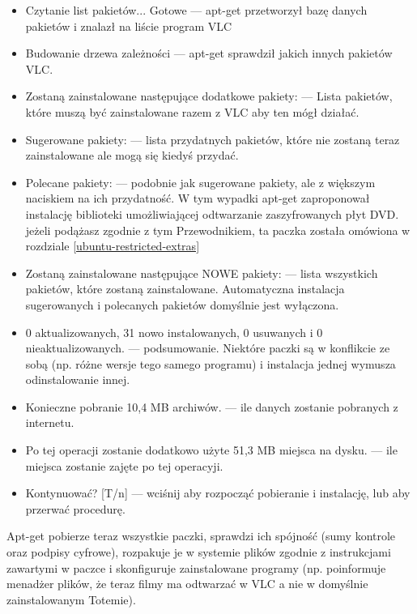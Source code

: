 \begin{itemize}
\item \textcolor{ubuntu_orange}{Czytanie list pakietów... Gotowe} --- apt-get przetworzył bazę danych pakietów i znalazł na liście program VLC
\item \textcolor{ubuntu_orange}{Budowanie drzewa zależności} --- apt-get sprawdził jakich innych pakietów VLC.
\item \textcolor{ubuntu_orange}{Zostaną zainstalowane następujące dodatkowe pakiety:} --- Lista pakietów, które muszą być zainstalowane razem z VLC aby ten mógł działać.
\item \textcolor{ubuntu_orange}{Sugerowane pakiety:} --- lista przydatnych pakietów, które nie zostaną teraz zainstalowane ale mogą się kiedyś przydać.
\item \textcolor{ubuntu_orange}{Polecane pakiety:} --- podobnie jak sugerowane pakiety, ale z większym naciskiem na ich przydatność. W tym wypadki apt-get zaproponował instalację biblioteki umożliwiającej odtwarzanie zaszyfrowanych płyt DVD. jeżeli podążasz zgodnie z tym Przewodnikiem, ta paczka została omówiona w rozdziale \ref{ubuntu-restricted-extras}
\item \textcolor{ubuntu_orange}{Zostaną zainstalowane następujące NOWE pakiety:} --- lista wszystkich pakietów, które zostaną zainstalowane. Automatyczna instalacja sugerowanych i polecanych pakietów domyślnie jest wyłączona.
\item \textcolor{ubuntu_orange}{0 aktualizowanych, 31 nowo instalowanych, 0 usuwanych i 0 nieaktualizowanych.} --- podsumowanie. Niektóre paczki są w konflikcie ze sobą (np. różne wersje tego samego programu) i instalacja jednej wymusza odinstalowanie innej.
\item \textcolor{ubuntu_orange}{Konieczne pobranie 10,4 MB archiwów.} --- ile danych zostanie pobranych z internetu.
\item \textcolor{ubuntu_orange}{Po tej operacji zostanie dodatkowo użyte 51,3 MB miejsca na dysku.} --- ile miejsca zostanie zajęte po tej operacyji.
\item \textcolor{ubuntu_orange}{Kontynuować? [T/n]} --- wciśnij  aby rozpocząć pobieranie i instalację, lub  aby przerwać procedurę.
\end{itemize}

Apt-get pobierze teraz wszystkie paczki, sprawdzi ich spójność (sumy kontrole oraz podpisy cyfrowe), rozpakuje je w systemie plików zgodnie z instrukcjami zawartymi w paczce i skonfiguruje zainstalowane programy (np. poinformuje menadżer plików, że teraz filmy ma odtwarzać w VLC a nie w domyślnie zainstalowanym Totemie).

